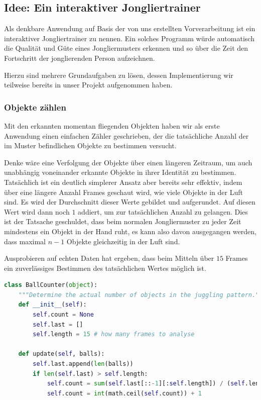 \documentclass[12pt,a4paper,ngerman]{scrartcl}
\begin{document}
\subsection{Idee: Ein interaktiver Jongliertrainer}

Als denkbare Anwendung auf Basis der von uns erstellten Vorverarbeitung ist ein
interaktiver Jongliertrainer zu nennen. Ein solches Programm würde automatisch die
Qualität und Güte eines Jongliermusters erkennen und so über die Zeit den Fortschritt
der jonglierenden Person aufzeichnen.

Hierzu sind mehrere Grundaufgaben zu lösen, dessen Implementierung wir teilweise
bereits in unser Projekt aufgenommen haben.

\subsubsection{Objekte zählen}

Mit den erkannten momentan fliegenden Objekten haben wir als erste Anwendung einen
einfachen Zähler geschrieben, der die tatsächliche Anzahl der im Muster befindlichen Objekte zu bestimmen versucht.

Denke wäre eine Verfolgung der Objekte über einen längeren Zeitraum, um auch
unabhängig voneinander erkannte Objekte in ihrer Identität zu bestimmen. Tatsächlich
ist ein deutlich simplerer Ansatz aber bereits sehr effektiv, indem über eine
längere Anzahl Frames geschaut wird, wie viele Objekte in der Luft sind. Es wird der
Durchschnitt dieser Werte gebildet und aufgerundet. Auf diesen Wert wird dann noch
$1$ addiert, um zur tatsächlichen Anzahl zu gelangen. Dies ist der Tatsache
geschuldet, dass beim normalen Jongliermuster zu jeder Zeit mindestens ein Objekt in der Hand ruht, es kann also davon ausgegangen werden, dass maximal $n - 1$ Objekte
gleichzeitig in der Luft sind.

Ausprobieren auf echten Daten hat ergeben, dass beim Mitteln über $15$ Frames
ein zuverlässiges Bestimmen des tatsächlichen Wertes möglich ist.

\begin{lstlisting}[language=Python]
class BallCounter(object):
    """Determine the actual number of objects in the juggling pattern."""
    def __init__(self):
        self.count = None
        self.last = []
        self.length = 15 # how many frames to analyse

    def update(self, balls):
        self.last.append(len(balls))
        if len(self.last) > self.length:
            self.count = sum(self.last[::-1][:self.length]) / (self.length*1.0)
            self.count = int(math.ceil(self.count)) + 1
\end{lstlisting}
\end{document}
